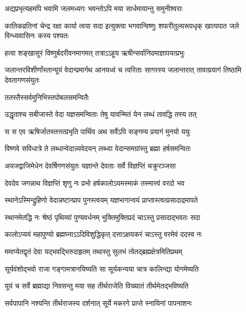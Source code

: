 \twolineshloka
{अद्यप्रभृत्यहमपि भवामि जलमध्यगः}
{भवन्तोऽपि मया सार्धमायान्तु समुनीश्वराः} %

\threelineshloka
{कातिकव्रतिनां चेन्द्र रक्षा कार्या त्वया सदा}
{इत्युक्त्वा भगवान्विष्णुः शफरीतुल्यरूपधृक्}
{खात्पपात जले विन्ध्यवासिनः कस्य पश्यतः} %

\twolineshloka
{हत्वा शङ्खासुरं विष्णुर्बदरीवनमागमत्}
{तत्राऽऽहूय ऋषीन्सर्वानिदमाज्ञापयत्प्रभुः} %


\threelineshloka
{जलान्तरविशीर्णांस्तान्यूयं वेदान्प्रमार्गथ}
{आनयध्वं च त्वरिताः सागरस्य जलान्तरात्}
{तावत्प्रयागं तिष्ठामि देवतागणसंयुतः} %



\onelineshloka
{ततस्तैस्सर्वमुनिभिस्तपोबलसमन्वितैः} %

\twolineshloka
{उद्धृताश्च सबीजास्ते वेदा यज्ञसमन्विताः}
{तेषु यावन्मितं येन लब्धं तावद्धि तस्य तत्} %

\twolineshloka
{स स एव ऋषिर्जातस्तत्तत्प्रभृति पार्थिव}
{अथ सर्वेऽपि सङ्गम्य प्रयागं मुनयो ययुः} %

\twolineshloka
{विष्णवे सविधात्रे ते लब्धान्वेदान्न्यवेदयन्}
{लब्ध्वा वेदान्समग्रांस्तु ब्रह्मा हर्षसमन्वितः} %

\twolineshloka
{अयजद्वाजिमेधेन देवर्षिगणसंयुतः}
{यज्ञान्ते देवताः सर्वे विज्ञप्तिं चक्रुरञ्जसा} %


\twolineshloka
{देवदेव जगन्नाथ विज्ञप्तिं शृणु नः प्रभो}
{हर्षकालोऽयमस्माकं तस्मात्त्वं वरदो भव} %

\twolineshloka
{स्थानेऽस्मिन्द्रुहिणो वेदान्नष्टान्प्राप पुनस्त्वयम्}
{यज्ञभागान्वयं प्राप्तास्त्वत्प्रसादाद्रमापते} %

\twolineshloka
{स्थानमेतद्धि नः श्रेष्ठं पृथिव्यां पुण्यवर्धनम्}
{भुक्तिमुक्तिप्रदं चाऽस्तु प्रसादाद्भवतः सदा} %

\twolineshloka
{कालोऽप्ययं महापुण्यो ब्रह्मघ्नाऽऽदिविशुद्धिकृत्}
{दत्ताऽक्षयकरं चाऽस्तु वरमेवं ददस्व नः} %


\twolineshloka
{ममाप्येतद्वृतं देवा यद्भवद्भिरुदाहृतम्}
{तथास्तु सुलभं त्वेतद्ब्रह्मक्षेत्रमितिप्रथम्} %

\twolineshloka
{सूर्यवंशोद्भवो राजा गङ्गामत्रानयिष्यति}
{सा सूर्यकन्यया चात्र कालिन्द्या योगमेष्यति} %

\twolineshloka
{यूयं च सर्वे ब्रह्माद्या निवसन्तु मया सह}
{तीर्थराजेति विख्यातं तीर्थमेतद्भविष्यति} %

\twolineshloka
{सर्वपापानि नश्यन्ति तीर्थराजस्य दर्शनात्}
{सूर्ये मकरगे प्राप्ते स्नायिनां पापनाशनः} %

